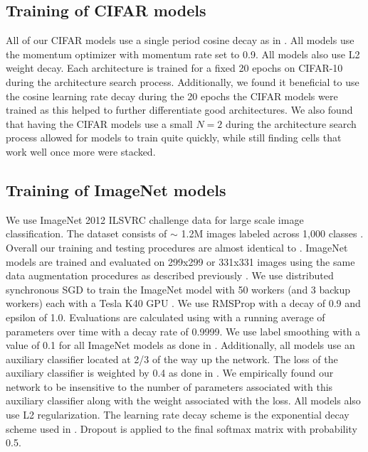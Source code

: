 \subsection{Training of CIFAR models}
All of our CIFAR models use a single period cosine decay as in \cite{loshchilov2016sgdr, gastaldi17shakeshake}.  All models use the momentum optimizer with momentum rate set to 0.9. All models also use L2 weight decay. Each architecture is trained for a fixed 20 epochs on CIFAR-10 during the architecture search process. Additionally, we found it beneficial to use the cosine learning rate decay during the 20 epochs the CIFAR models were trained as this helped to further differentiate good architectures. We also found that having the CIFAR models use a small $N=2$ during the architecture search process allowed for models to train quite quickly, while still finding cells that work well once more were stacked.

\subsection{Training of ImageNet models}

We use ImageNet 2012 ILSVRC challenge data for large scale image classification. The dataset consists of $\sim$ 1.2M images labeled across 1,000 classes \cite{deng2009imagenet}. Overall our training and testing procedures are almost identical to \cite{szegedy2016rethinking}. ImageNet models are trained and evaluated on 299x299 or 331x331 images using the same data augmentation procedures as described previously \cite{szegedy2016rethinking}. We use distributed synchronous SGD to train the ImageNet model with 50 workers (and 3 backup workers) each with a Tesla K40 GPU \cite{synchsgd}. We use RMSProp with a decay of 0.9 and epsilon of 1.0. Evaluations are calculated using with a running average of parameters over time with a decay rate of 0.9999. We use label smoothing with a value of 0.1 for all ImageNet models as done in \cite{szegedy2016rethinking}. Additionally, all models use an auxiliary classifier located at 2/3 of the way up the network. The loss of the auxiliary classifier is weighted by 0.4 as done in \cite{szegedy2016rethinking}. We empirically found our network to be insensitive to the number of parameters associated with this auxiliary classifier along with the weight associated with the loss. All models also use L2 regularization.  The learning rate decay scheme is the exponential decay scheme used in \cite{szegedy2016rethinking}.  Dropout is applied to the final softmax matrix with probability 0.5.




